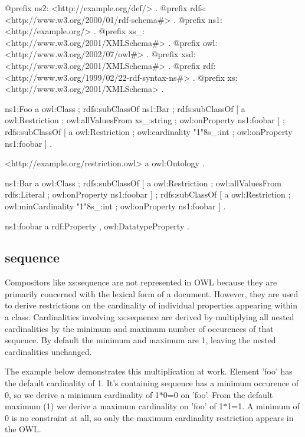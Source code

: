\begin{DoxyCodeInclude}
@prefix ns2:     <http://example.org/def/> .
@prefix rdfs:    <http://www.w3.org/2000/01/rdf-schema#> .
@prefix ns1:     <http://example.org/> .
@prefix xs_:     <http://www.w3.org/2001/XMLSchema#> .
@prefix owl:     <http://www.w3.org/2002/07/owl#> .
@prefix xsd:     <http://www.w3.org/2001/XMLSchema#> .
@prefix rdf:     <http://www.w3.org/1999/02/22-rdf-syntax-ns#> .
@prefix xs:      <http://www.w3.org/2001/XMLSchema> .

ns1:Foo
      a       owl:Class ;
      rdfs:subClassOf ns1:Bar ;
      rdfs:subClassOf
              [ a       owl:Restriction ;
                owl:allValuesFrom xs_:string ;
                owl:onProperty ns1:foobar
              ] ;
      rdfs:subClassOf
              [ a       owl:Restriction ;
                owl:cardinality "1"^^xs_:int ;
                owl:onProperty ns1:foobar
              ] .

<http://example.org/restriction.owl>
      a       owl:Ontology .

ns1:Bar
      a       owl:Class ;
      rdfs:subClassOf
              [ a       owl:Restriction ;
                owl:allValuesFrom rdfs:Literal ;
                owl:onProperty ns1:foobar
              ] ;
      rdfs:subClassOf
              [ a       owl:Restriction ;
                owl:minCardinality "1"^^xs_:int ;
                owl:onProperty ns1:foobar
              ] .

ns1:foobar
      a       rdf:Property , owl:DatatypeProperty .
\end{DoxyCodeInclude}
 \hypertarget{sequence}{}\subsection{sequence}\label{sequence}
Compositors like xs:sequence are not represented in OWL because they are primarily concerned with the lexical form of a document. However, they are used to derive restrictions on the cardinality of individual properties appearing within a class. Cardinalities involving xs:sequence are derived by multiplying all nested cardinalities by the minimum and maximum number of occurences of that sequence. By default the minimum and maximum are 1, leaving the nested cardinalities unchanged.

The example below demonstrates this multiplication at work. Element 'foo' has the default cardinality of 1. It's containing sequence has a minimum occurence of 0, so we derive a minimum cardinality of 1$\ast$0=0 on 'foo'. From the default maximum (1) we derive a maximum cardinality on 'foo' of 1$\ast$1=1. A minimum of 0 is no constraint at all, so only the maximum cardinality restriction appears in the OWL.


